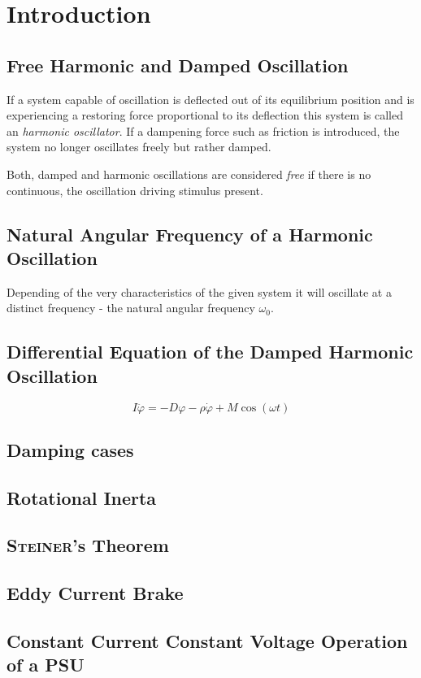\chapter{Introduction}
%
\section*{Free Harmonic and Damped Oscillation}
If a system capable of oscillation is deflected out of its equilibrium position and is experiencing a restoring force
proportional to its deflection this system is called an \textit{harmonic oscillator}. If a dampening force such as friction
is introduced, the system no longer oscillates freely but rather damped.\par
Both, damped and harmonic oscillations are considered \textit{free} if there is no continuous, the oscillation driving
stimulus present.
%
\section*{Natural Angular Frequency of a Harmonic Oscillation}
%
Depending of the very characteristics of the given system it will oscillate at a distinct frequency - the natural angular
frequency \( \omega_0 \).
\section*{Differential Equation of the Damped Harmonic Oscillation}
\begin{equation}
    I \ddot{\varphi} = -D\varphi -\rho\dot{\varphi}+M\cos(\omega t)
\end{equation}
\section*{Damping cases}
\section*{Rotational Inerta}
\section*{\textsc{Steiner}'s Theorem}
\section*{Eddy Current Brake}
\section*{Constant Current Constant Voltage Operation of a PSU}
